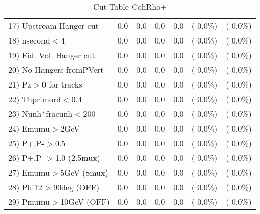 \begin{table}[h!]
\begin{tabular}{||l||r|r|r|r|r|r||}
 17) Upstream Hanger cut  &          0.0 &          0.0 &          0.0 &          0.0 & (  0.0\%) & (  0.0\%) \\
 18) nsecond$<$4          &          0.0 &          0.0 &          0.0 &          0.0 & (  0.0\%) & (  0.0\%) \\
 19) Fid. Vol. Hanger cut &          0.0 &          0.0 &          0.0 &          0.0 & (  0.0\%) & (  0.0\%) \\
 20) No Hangers fromPVert &          0.0 &          0.0 &          0.0 &          0.0 & (  0.0\%) & (  0.0\%) \\
 21) Pz$>$0 for tracks    &          0.0 &          0.0 &          0.0 &          0.0 & (  0.0\%) & (  0.0\%) \\
 22) Thprimord$<$0.4      &          0.0 &          0.0 &          0.0 &          0.0 & (  0.0\%) & (  0.0\%) \\
 23) Nunh*fracunh$<$200   &          0.0 &          0.0 &          0.0 &          0.0 & (  0.0\%) & (  0.0\%) \\
 24) Emumu$>$2GeV         &          0.0 &          0.0 &          0.0 &          0.0 & (  0.0\%) & (  0.0\%) \\
 25) P+,P-$>$0.5          &          0.0 &          0.0 &          0.0 &          0.0 & (  0.0\%) & (  0.0\%) \\
 26) P+,P-$>$1.0 (2.5mux) &          0.0 &          0.0 &          0.0 &          0.0 & (  0.0\%) & (  0.0\%) \\
 27) Emumu$>$5GeV  (8mux) &          0.0 &          0.0 &          0.0 &          0.0 & (  0.0\%) & (  0.0\%) \\
 28) Phi12$>$90deg  (OFF) &          0.0 &          0.0 &          0.0 &          0.0 & (  0.0\%) & (  0.0\%) \\
 29) Pmumu$>$10GeV  (OFF) &          0.0 &          0.0 &          0.0 &          0.0 & (  0.0\%) & (  0.0\%) \\
 \hline
 \hline
 \end{tabular}
 \caption{Cut Table  CohRho+  }
 \label{tab-cutcohjpsi-mumu_anumunc}
 \end{table}
